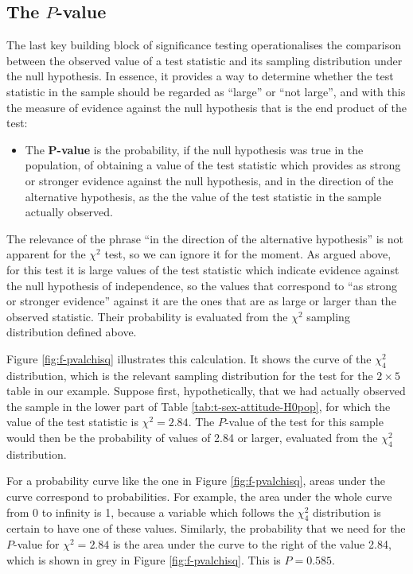 \documentclass[11pt,a4paper,openany]{book}
\providecommand{\tightlist}{%
  \setlength{\itemsep}{0pt}\setlength{\parskip}{0pt}}
\begin{document}
\subsection{\texorpdfstring{The
\(P\)-value}{The P-value}}\label{ss-tables-chi2test-Pval}

The last key building block of significance testing operationalises the
comparison between the observed value of a test statistic and its
sampling distribution under the null hypothesis. In essence, it provides
a way to determine whether the test statistic in the sample should be
regarded as ``large'' or ``not large'', and with this the measure of
evidence against the null hypothesis that is the end product of the
test:

\begin{itemize}
\tightlist
\item
  The \(\mathbf{P}\)\textbf{-value} is the probability, if the null
  hypothesis was true in the population, of obtaining a value of the
  test statistic which provides as strong or stronger evidence against
  the null hypothesis, and in the direction of the alternative
  hypothesis, as the the value of the test statistic in the sample
  actually observed.
\end{itemize}

The relevance of the phrase ``in the direction of the alternative
hypothesis'' is not apparent for the \(\chi^{2}\) test, so we can ignore
it for the moment. As argued above, for this test it is large values of
the test statistic which indicate evidence against the null hypothesis
of independence, so the values that correspond to ``as strong or
stronger evidence'' against it are the ones that are as large or larger
than the observed statistic. Their probability is evaluated from the
\(\chi^{2}\) sampling distribution defined above.

Figure \ref{fig:f-pvalchisq} illustrates this calculation. It shows the
curve of the \(\chi^{2}_{4}\) distribution, which is the relevant
sampling distribution for the test for the \(2\times 5\) table in our
example. Suppose first, hypothetically, that we had actually observed
the sample in the lower part of Table \ref{tab:t-sex-attitude-H0pop},
for which the value of the test statistic is \(\chi^{2}=2.84\). The
\(P\)-value of the test for this sample would then be the probability of
values of 2.84 or larger, evaluated from the \(\chi^{2}_{4}\)
distribution.

For a probability curve like the one in Figure \ref{fig:f-pvalchisq},
areas under the curve correspond to probabilities. For example, the area
under the whole curve from 0 to infinity is 1, because a variable which
follows the \(\chi^{2}_{4}\) distribution is certain to have one of
these values. Similarly, the probability that we need for the
\(P\)-value for \(\chi^{2}=2.84\) is the area under the curve to the
right of the value 2.84, which is shown in grey in Figure
\ref{fig:f-pvalchisq}. This is \(P=0.585\).
\end{document}

